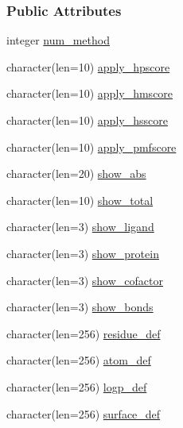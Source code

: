 \subsubsection*{Public Attributes}
\begin{DoxyCompactItemize}
\item 
integer \hyperlink{structcalc__xscore_1_1txinput_a8455fab659a620b94f946b6c9524de13}{num\-\_\-method}
\item 
character(len=10) \hyperlink{structcalc__xscore_1_1txinput_ab7f3e902b07ea664b0bc35e83c395a33}{apply\-\_\-hpscore}
\item 
character(len=10) \hyperlink{structcalc__xscore_1_1txinput_a80ad95b803df59eddb4c71bab243e490}{apply\-\_\-hmscore}
\item 
character(len=10) \hyperlink{structcalc__xscore_1_1txinput_a662e402c9e1def2eb44860c177e554d5}{apply\-\_\-hsscore}
\item 
character(len=10) \hyperlink{structcalc__xscore_1_1txinput_a03d4ee92fb6029b4a7a6f1962d61e398}{apply\-\_\-pmfscore}
\item 
character(len=20) \hyperlink{structcalc__xscore_1_1txinput_a95da9ef67643a21423429f38dfa36be1}{show\-\_\-abs}
\item 
character(len=10) \hyperlink{structcalc__xscore_1_1txinput_a3dc54e8b7db596a2907d35304dc01c49}{show\-\_\-total}
\item 
character(len=3) \hyperlink{structcalc__xscore_1_1txinput_a8d13a4c4d79c1a5606669157b5a61e62}{show\-\_\-ligand}
\item 
character(len=3) \hyperlink{structcalc__xscore_1_1txinput_aabc83b6bd164f155ea2e78bcd1ff81ae}{show\-\_\-protein}
\item 
character(len=3) \hyperlink{structcalc__xscore_1_1txinput_a3e40c25a2524d886ee23f1e6de6ff011}{show\-\_\-cofactor}
\item 
character(len=3) \hyperlink{structcalc__xscore_1_1txinput_a307d617915bda2eb4dbc77d8967d5a67}{show\-\_\-bonds}
\item 
character(len=256) \hyperlink{structcalc__xscore_1_1txinput_a262c701fded1a926cc7c0689425bb0f5}{residue\-\_\-def}
\item 
character(len=256) \hyperlink{structcalc__xscore_1_1txinput_a5055a301a66df907e9fced95959f1b02}{atom\-\_\-def}
\item 
character(len=256) \hyperlink{structcalc__xscore_1_1txinput_a4c275d7efa9ff41a10c571826e9b3439}{logp\-\_\-def}
\item 
character(len=256) \hyperlink{structcalc__xscore_1_1txinput_a0f053dcb02716a4915698e4e197c2695}{surface\-\_\-def}

\end{DoxyCompactItemize}
